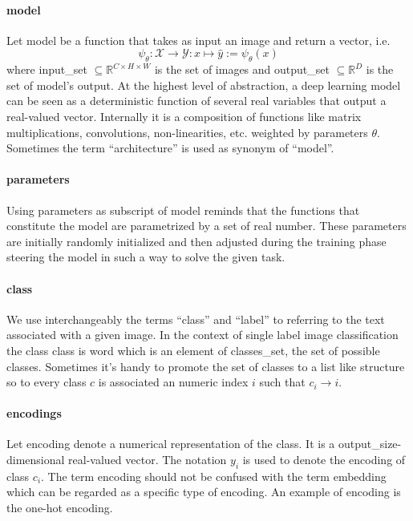 \paragraph{model} Let \gls{model} be a function that takes as input an image and return a vector, i.e.\
\begin{equation}
  \psi_\theta: \mathcal{X} \to \mathcal{Y}
     : x \mapsto \hat{y} := \psi_\theta \left(x\right)
  \label{eq:model}
\end{equation}
where \gls{input_set} $\subseteq \mathbb{R}^{C \times H \times W}$ is the set of images and \gls{output_set} $\subseteq \mathbb{R}^{D}$ is the set of model's output. At the highest level of abstraction, a deep learning model can be seen as a deterministic function of several real variables that output a real-valued vector. Internally it is a composition of functions like matrix multiplications, convolutions, non-linearities, etc. weighted by parameters $\theta$. Sometimes the term ``architecture'' is used as synonym of ``model''.

\paragraph{parameters} Using \gls{parameters} as subscript of \gls{model}
reminds that the functions that constitute the model are parametrized by a set of real number. These parameters are initially randomly initialized and then adjusted during the training phase steering the model in such a way to solve the given task.

\paragraph{class} We use interchangeably the terms ``class'' and ``label'' to referring to the text associated with a given image. In the context of single label image classification the class \gls{class} is word which is an element of \gls{classes_set}, the set of possible classes. Sometimes it's handy to promote the set of classes to a list like structure so to every class $c$ is associated an numeric index $i$ such that $c_i \to i$.

\paragraph{encodings} Let \gls{encoding} denote a numerical representation of the class. It is a \gls{output_size}-dimensional real-valued vector. The notation $y_i$ is used to denote the encoding of class $c_i$. The term encoding should not be confused with the term embedding which can be regarded as a specific type of encoding. An example of encoding is the one-hot encoding.

